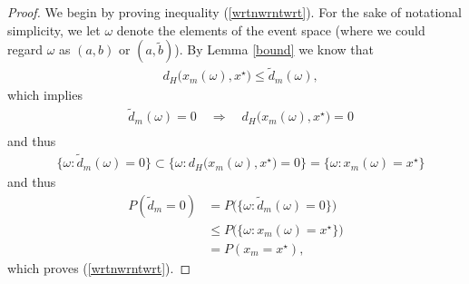 \documentclass[a4paper,aps,floatfix]{revtex4}
\begin{document}
\begin{proof}
We begin by proving inequality (\ref{wrtnwrntwrt}). For the sake of notational simplicity, we let $\omega$ denote the elements of the event space (where we could regard $\omega$ as $(a,b)$ or $(a,\tilde{b})$).
By Lemma \ref{bound} we know that 
\begin{equation}
\begin{split} 
& d_H\big(x_m(\omega),x^{\star}\big) \leq \tilde{d}_m(\omega),
\end{split}
\end{equation}
which  implies
\begin{equation}
\begin{split}
& \tilde{d}_m(\omega) = 0\quad \Rightarrow \quad d_H\big(x_m(\omega),x^{\star}\big) =0\\
\end{split}
\end{equation}
and thus
\begin{equation}
\label{fdnsnnnrnwm}
\begin{split}
& \{\omega: \tilde{d}_m(\omega) = 0\} \subset \{\omega: d_H\big(x_m(\omega),x^{\star}\big) = 0\} = \{\omega: x_m(\omega) = x^{\star}\}
\end{split}
\end{equation}
and thus 
\begin{equation}
\begin{split}
P(\tilde{d}_m = 0) & = P\big(\{\omega: \tilde{d}_m(\omega) = 0\}\big) \\
& \leq P\big(  \{\omega: x_m(\omega) = x^{\star}\}\big)\\
& = P(x_m  = x^{\star}),
\end{split}
\end{equation}
which proves (\ref{wrtnwrntwrt}).






\end{proof}
\end{document}
